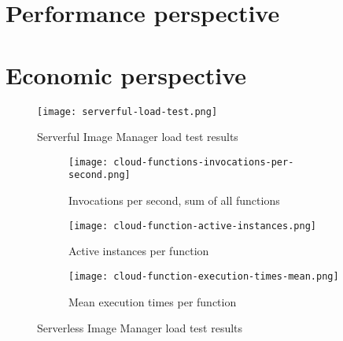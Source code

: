 
\section{Performance perspective}

\section{Economic perspective}

\begin{figure}[h]
  \centering
  \texttt{[image: serverful-load-test.png]}
  \caption{Serverful Image Manager load test results}
  \label{fig:serverfulLoadTest}
\end{figure}

\begin{figure}
  \centering
  \begin{subfigure}[b]{0.9\textwidth}
      \texttt{[image: cloud-functions-invocations-per-second.png]}
      \caption{Invocations per second, sum of all functions}
      \label{fig:tiger}
  \end{subfigure}

  \begin{subfigure}[b]{0.9\textwidth}
      \texttt{[image: cloud-function-active-instances.png]}
      \caption{Active instances per function}
      \label{fig:gull}
  \end{subfigure}

  \begin{subfigure}[b]{0.9\textwidth}
      \texttt{[image: cloud-function-execution-times-mean.png]}
      \caption{Mean execution times per function}
      \label{fig:mouse}
  \end{subfigure}
  \caption{Serverless Image Manager load test results}\label{fig:serverlessLoadTest}
\end{figure}

